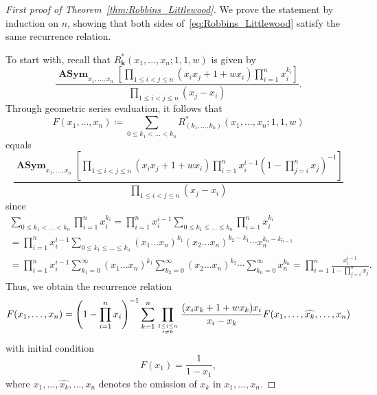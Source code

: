 \documentclass[10pt,a4paper]{article}
\theoremstyle{definition}
\newcommand\myatop[2]{\genfrac{}{}{0pt}{}{#1}{#2}}
\DeclareMathOperator{\asym}{\mathbf{ASym}}
\newcommand{\boldk}{\boldsymbol{k}}
\begin{document}
	\begin{proof}[First proof of Theorem~\ref{thm:Robbins_Littlewood}]
		We prove the statement by induction on $n$, showing that both sides of~\eqref{eq:Robbins_Littlewood} satisfy the same recurrence relation.
		
		To start with, recall that $R_{\boldk}^{\ast}(x_{1},\ldots,x_{n};1,1,w)$ is given by
		\begin{equation*}
			\frac{\asym_{x_{1},\ldots,x_{n}}\left[\prod_{1\le i<j\le n}(x_{i}x_{j}+1+wx_{i})\prod_{i=1}^{n}x_{i}^{k_{i}}\right]}{\prod_{1\le i<j\le n}(x_{j}-x_{i})}.
		\end{equation*}
		Through geometric series evaluation, it follows that
		\begin{equation*}
			F(x_1,\ldots,x_n) \coloneqq \sum_{0 \le k_1 < \dots < k_n} R^{\ast}_{(k_{1},\ldots,k_{n})}(x_{1},\ldots,x_{n};1,1,w)
		\end{equation*} equals
		\begin{equation}\label{eq:asym_expression} 
			\frac{\asym_{x_{1},\ldots,x_{n}}\left[\prod_{1\le i<j\le n}(x_{i}x_{j}+1+wx_{i})\prod_{i=1}^{n}x_{i}^{i-1}(1-\prod_{j=i}^n x_j)^{-1}\right]}{\prod_{1\le i<j\le n}(x_{j}-x_{i})} 
		\end{equation}
		since 	
		\begin{multline*}
			\sum_{0 \le k_1 < \dots < k_n} \prod_{i=1}^{n} x_i^{k_i} =\prod_{i=1}^{n} x_i^{i-1} \sum_{0 \le k_1 \le \dots \le k_n} \prod_{i=1}^{n} x_i^{k_i} \\
			= \prod_{i=1}^{n} x_i^{i-1} \sum_{0 \le k_1 \le \dots \le k_n} (x_1 \dots x_n)^{k_1} (x_2 \dots x_n)^{k_2-k_1} \cdots x_n^{k_n-k_{n-1}}\\
			= \prod_{i=1}^{n} x_i^{i-1} \sum_{k_1=0}^{\infty} (x_1 \dots x_n)^{k_1} \sum_{k_2=0}^{\infty} (x_2 \dots x_n)^{k_2} \cdots  \sum_{k_n=0}^{\infty} x_n^{k_n} = \prod_{i=1}^{n} \frac{x_i^{i-1}}{1-\prod_{j=i}^{n} x_j}.
		\end{multline*}
		Thus, we obtain the recurrence relation
		\begin{equation}\label{eq:rec_Littlewood}
			F(x_1,\ldots,x_n) = 
			\left(1-\prod_{i=1}^n x_i \right)^{-1}  \sum\limits_{k=1}^n \prod\limits_{\myatop{1 \le i \le n}{i \neq k}} \frac{(x_i x_k+1+w x_k) x_i}{x_i-x_k}
			F(x_1,\ldots,\widehat{x_k},\ldots,x_n)
		\end{equation}
		with initial condition
		\begin{equation*}
			F(x_1)=\frac{1}{1-x_1},
		\end{equation*}
		where $x_1,\ldots,\widehat{x_k},\ldots,x_n$ denotes the omission of $x_k$ in $x_1,\ldots,x_n$. 
		

\end{proof}
\end{document}
